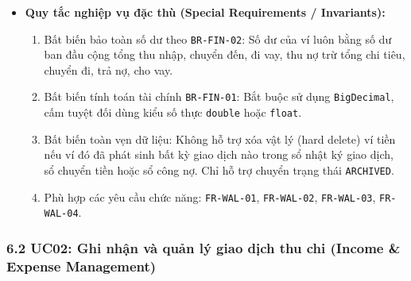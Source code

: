 \documentclass[11pt,a4paper]{article}
\providecommand{\tightlist}{
  \setlength{\itemsep}{0pt}\setlength{\parskip}{0pt}}
\begin{document}
\begin{itemize}
\begin{itemize}
    \begin{itemize}
    \tightlist
    \item
      5c1. Nếu hệ thống phát hiện yêu cầu sửa đổi trực tiếp trường số dư
      khả dụng (\texttt{currentBalance} hoặc \texttt{initialBalance})
      của một ví đã có giao dịch lịch sử.
    \item
      5c2. Hệ thống từ chối thực thi, ném ngoại lệ vi phạm bất biến dữ
      liệu tài chính và ghi nhật ký cảnh báo an toàn.
    \end{itemize}
  \item
    \emph{2d3a. Tổng số dư toàn bộ các ví bằng 0 khi tính cơ cấu:}

    \begin{itemize}
    \tightlist
    \item
      2d3a1. Tại bước 2d3, hệ thống ghi nhận \(TotalWallets = 0\).
    \item
      2d3a2. Hệ thống gán tỷ trọng của toàn bộ các ví bằng đúng 0.00\%,
      tuyệt đối không thực hiện phép chia cho 0 nhằm tránh lỗi
      \texttt{ArithmeticException}.
    \end{itemize}
  \end{itemize}
\item
  \textbf{Quy tắc nghiệp vụ đặc thù (Special Requirements /
  Invariants):}

  \begin{enumerate}
  \def\labelenumi{\arabic{enumi}.}
  \tightlist
  \item
    Bất biến bảo toàn số dư theo \texttt{BR-FIN-02}: Số dư của ví luôn
    bằng số dư ban đầu cộng tổng thu nhập, chuyển đến, đi vay, thu nợ
    trừ tổng chi tiêu, chuyển đi, trả nợ, cho vay.
  \item
    Bất biến tính toán tài chính \texttt{BR-FIN-01}: Bắt buộc sử dụng
    \texttt{BigDecimal}, cấm tuyệt đối dùng kiểu số thực \texttt{double}
    hoặc \texttt{float}.
  \item
    Bất biến toàn vẹn dữ liệu: Không hỗ trợ xóa vật lý (hard delete) ví
    tiền nếu ví đó đã phát sinh bất kỳ giao dịch nào trong sổ nhật ký
    giao dịch, sổ chuyển tiền hoặc sổ công nợ. Chỉ hỗ trợ chuyển trạng
    thái \texttt{ARCHIVED}.
  \item
    Phù hợp các yêu cầu chức năng: \texttt{FR-WAL-01},
    \texttt{FR-WAL-02}, \texttt{FR-WAL-03}, \texttt{FR-WAL-04}.
  \end{enumerate}
\end{itemize}

\subsubsection{6.2 UC02: Ghi nhận và quản lý giao dịch thu chi (Income
\& Expense
Management)}\label{62-uc02-ghi-nhux1eadn-vuxe0-quux1ea3n-luxfd-giao-dux1ecbch-thu-chi-income--expense-management}
\end{document}
